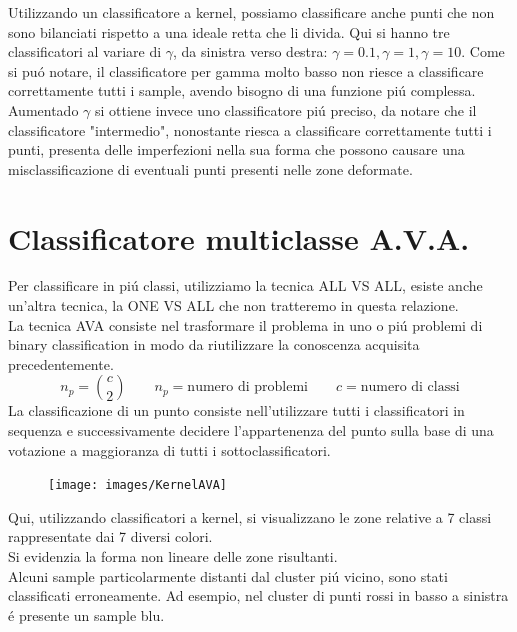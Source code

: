 \documentclass[12pt]{article}
\begin{document}
Utilizzando un classificatore a kernel, possiamo classificare anche punti che non sono
bilanciati rispetto a una ideale retta che li divida.
Qui si hanno tre classificatori al variare di $\gamma$, da sinistra verso destra:
$\gamma = 0.1, \gamma = 1, \gamma = 10$.
Come si puó notare, il classificatore per gamma molto basso non riesce a classificare
correttamente tutti i sample, avendo bisogno di una funzione piú complessa.
Aumentado $\gamma$ si ottiene invece uno classificatore piú preciso, da notare che
il classificatore "intermedio", nonostante riesca a classificare correttamente tutti i punti,
presenta delle imperfezioni nella sua forma che possono causare una misclassificazione di eventuali
punti presenti nelle zone deformate.

\newpage
\section{Classificatore multiclasse A.V.A.}

Per classificare in piú classi, utilizziamo la tecnica ALL VS ALL, esiste anche un'altra tecnica, la ONE VS ALL che non tratteremo in questa relazione. \\
La tecnica AVA consiste nel trasformare il problema in uno o piú problemi di binary classification in modo da riutilizzare la conoscenza acquisita precedentemente. \\
$$
  n_p = {c \choose 2} \qquad n_p = \text{numero di problemi} \qquad c = \text{numero di classi}
$$
La classificazione di un punto consiste nell'utilizzare tutti i classificatori in sequenza e successivamente
decidere l'appartenenza del punto sulla base di una votazione a maggioranza di tutti i sottoclassificatori.
\begin{figure}[H]
  \centering
  \texttt{[image: images/KernelAVA]}
\end{figure}
Qui, utilizzando classificatori a kernel, si visualizzano le zone relative a 7 classi rappresentate dai 7 diversi colori. \\
Si evidenzia la forma non lineare delle zone risultanti. \\
Alcuni sample particolarmente distanti dal cluster piú vicino, sono stati classificati erroneamente.
Ad esempio, nel cluster di punti rossi in basso a sinistra é presente un sample blu.
\end{document}
